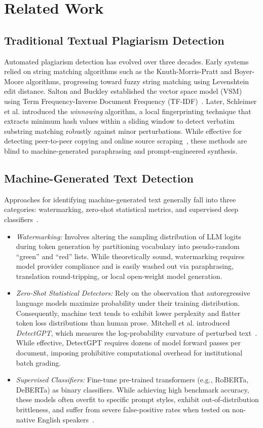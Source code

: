 \documentclass[journal]{IEEEtran}
\begin{document}
\section{Related Work}

\subsection{Traditional Textual Plagiarism Detection}
Automated plagiarism detection has evolved over three decades. Early systems relied on string matching algorithms such as the Knuth-Morris-Pratt and Boyer-Moore algorithms, progressing toward fuzzy string matching using Levenshtein edit distance. Salton and Buckley established the vector space model (VSM) using Term Frequency-Inverse Document Frequency (TF-IDF)~\cite{salton1988term}. Later, Schleimer et al. introduced the \textit{winnowing} algorithm, a local fingerprinting technique that extracts minimum hash values within a sliding window to detect verbatim substring matching robustly against minor perturbations. While effective for detecting peer-to-peer copying and online source scraping~\cite{meuschke2013analyzing}, these methods are blind to machine-generated paraphrasing and prompt-engineered synthesis.

\subsection{Machine-Generated Text Detection}
Approaches for identifying machine-generated text generally fall into three categories: watermarking, zero-shot statistical metrics, and supervised deep classifiers~\cite{crothers2023machine}.
\begin{itemize}
    \item \textit{Watermarking:} Involves altering the sampling distribution of LLM logits during token generation by partitioning vocabulary into pseudo-random ``green'' and ``red'' lists. While theoretically sound, watermarking requires model provider compliance and is easily washed out via paraphrasing, translation round-tripping, or local open-weight model generation.
    \item \textit{Zero-Shot Statistical Detectors:} Rely on the observation that autoregressive language models maximize probability under their training distribution. Consequently, machine text tends to exhibit lower perplexity and flatter token loss distributions than human prose. Mitchell et al. introduced \textit{DetectGPT}, which measures the log-probability curvature of perturbed text~\cite{mitchell2023detectgpt}. While effective, DetectGPT requires dozens of model forward passes per document, imposing prohibitive computational overhead for institutional batch grading.
    \item \textit{Supervised Classifiers:} Fine-tune pre-trained transformers (e.g., RoBERTa, DeBERTa) as binary classifiers. While achieving high benchmark accuracy, these models often overfit to specific prompt styles, exhibit out-of-distribution brittleness, and suffer from severe false-positive rates when tested on non-native English speakers~\cite{liang2023gpt}.
\end{itemize}
\end{document}

